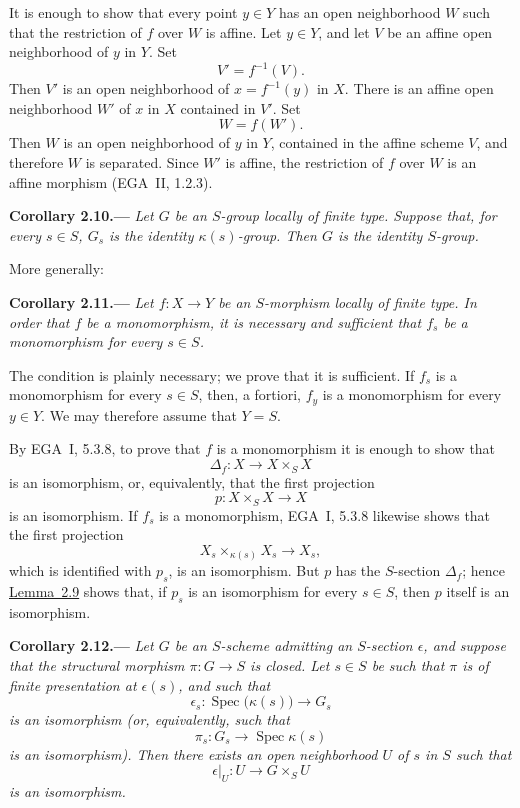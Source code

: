 It is enough to show that every point \(y\in Y\) has an open
neighborhood \(W\) such that the restriction of \(f\) over \(W\)
is affine. Let \(y\in Y\), and let \(V\) be an affine open
neighborhood of \(y\) in \(Y\). Set
\[
  V'=f^{-1}(V).
\]
Then \(V'\) is an open neighborhood of \(x=f^{-1}(y)\) in \(X\).
There is an affine open neighborhood \(W'\) of \(x\) in \(X\)
contained in \(V'\). Set
\[
  W=f(W').
\]
Then \(W\) is an open neighborhood of \(y\) in \(Y\), contained
in the affine scheme \(V\), and therefore \(W\) is separated.
Since \(W'\) is affine, the restriction of \(f\) over \(W\) is an
affine morphism (EGA~II, 1.2.3).

\medskip
{}\label{cor:sga3-VIB-2.10}%
\noindent\textbf{Corollary 2.10.---}
\emph{Let \(G\) be an \(S\)-group locally of finite type. Suppose
that, for every \(s\in S\), \(G_s\) is the identity
\(\kappa(s)\)-group. Then \(G\) is the identity \(S\)-group.}

More generally:

\medskip
{}\label{cor:sga3-VIB-2.11}%
\noindent\textbf{Corollary 2.11.---}
\emph{Let \(f:X\to Y\) be an \(S\)-morphism locally of finite
type. In order that \(f\) be a monomorphism, it is necessary and
sufficient that \(f_s\) be a monomorphism for every \(s\in S\).}

The condition is plainly necessary; we prove that it is
sufficient. If \(f_s\) is a monomorphism for every \(s\in S\),
then, a fortiori, \(f_y\) is a monomorphism for every \(y\in Y\).
We may therefore assume that \(Y=S\).

By EGA~I, 5.3.8, to prove that \(f\) is a monomorphism it is enough
to show that
\[
  \Delta_f:X\longrightarrow X\times_SX
\]
is an isomorphism, or, equivalently, that the first projection
\[
  p:X\times_SX\longrightarrow X
\]
is an isomorphism. If \(f_s\) is a monomorphism, EGA~I, 5.3.8
likewise shows that the first projection
\[
  X_s\times_{\kappa(s)}X_s\longrightarrow X_s,
\]
which is identified with \(p_s\), is an isomorphism. But \(p\)
has the \(S\)-section \(\Delta_f\); hence \hyperref[lem:sga3-VIB-2.9]{Lemma~2.9} shows that, if
\(p_s\) is an isomorphism for every \(s\in S\), then \(p\) itself
is an isomorphism.

\medskip
{}\label{cor:sga3-VIB-2.12}%
\noindent\textbf{Corollary 2.12.---}
\emph{Let \(G\) be an \(S\)-scheme admitting an \(S\)-section
\(\epsilon\), and suppose that the structural morphism
\(\pi:G\to S\) is closed. Let \(s\in S\) be such that \(\pi\) is
of finite presentation at \(\epsilon(s)\), and such that}
\[
  \epsilon_s:\operatorname{Spec}\bigl(\kappa(s)\bigr)
    \longrightarrow G_s
\]
\emph{is an isomorphism (or, equivalently, such that}
\[
  \pi_s:G_s\longrightarrow
    \operatorname{Spec}\kappa(s)
\]
\emph{is an isomorphism). Then there exists an open neighborhood
\(U\) of \(s\) in \(S\) such that}
\[
  \epsilon|_U:U\longrightarrow G\times_SU
\]
\emph{is an isomorphism.}

